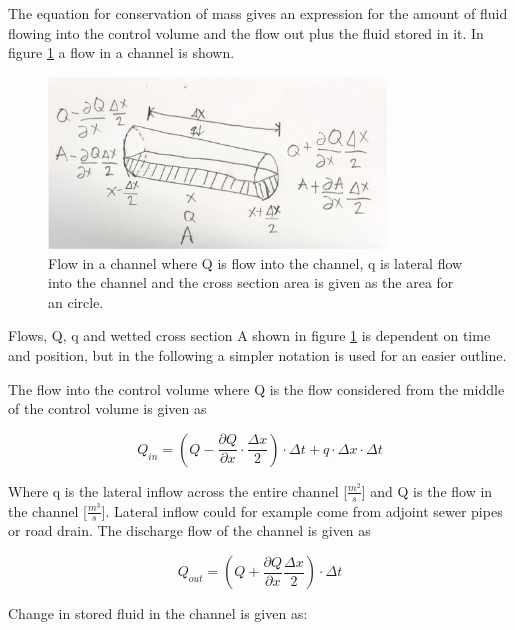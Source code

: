 The equation for conservation of mass gives an expression for the amount of fluid flowing into the control volume and the flow out plus the fluid stored in it.
In figure \ref{fig:firkant_kloak} a flow in a channel is shown.

\begin{figure}[H]
\centering
\includegraphics[width=0.8\textwidth]{report/modeling/pictures/continuity_open_channel.jpg}
\caption{Flow in a channel where Q is flow into the channel, q is lateral flow into the channel and the cross section area is given as the area for an circle.}
\label{fig:firkant_kloak}
\end{figure}

Flows, Q, q and wetted cross section A shown in figure \ref{fig:firkant_kloak} is dependent on time and position, but in the following a simpler notation is used for an easier outline. 

The flow into the control volume where Q is the flow considered from the middle of the control volume is given as

\begin{equation}
Q_{in} =	\left(Q - \frac{\partial Q}{\partial x}\cdot \frac{\Delta x}{2}\right) \cdot \Delta t + q \cdot \Delta x \cdot \Delta t
\label{flowin_saintbernard}
\end{equation}

Where q is the lateral inflow across the entire channel [$\frac{m^2}{s}$] and Q is the flow in the channel [$\frac{m^3}{s}$]. Lateral inflow could for example come from adjoint sewer pipes or road drain.
The discharge flow of the channel is given as

\begin{equation}
Q_{out} =\left(Q + \frac{\partial Q}{ \partial x} \frac{\Delta x}{2} \right) \cdot \Delta t 
\label{flowout_saintbernard}
\end{equation}

Change in stored fluid in the channel is given as:

